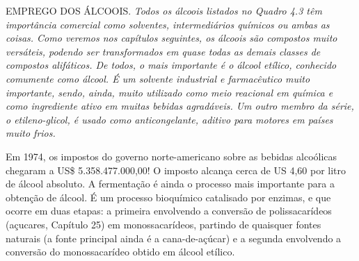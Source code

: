 \noindent EMPREGO DOS ÁLCOOIS. \emph{Todos os álcoois listados no Quadro 4.3 têm importância comercial como solventes, intermediários químicos ou ambas as coisas. Como veremos nos capítulos seguintes, os álcoois são compostos muito versáteis, podendo ser transformados em quase todas as demais classes de compostos alifáticos. De todos, o mais importante é o álcool etílico, conhecido comumente como álcool. É um solvente industrial e farmacêutico muito importante, sendo, ainda, muito utilizado como meio reacional em química e como ingrediente ativo em muitas bebidas agradáveis. Um outro membro da série, o etileno-glicol, é usado como anticongelante, aditivo para motores em países muito frios.}

Em 1974, os impostos do governo norte-americano sobre as bebidas alcoólicas chegaram a US\$ 5.358.477.000,00! O imposto alcança cerca de US 4,60 por litro de álcool absoluto. A fermentação é ainda o processo mais importante para a obtenção de álcool. É um processo bioquímico catalisado por enzimas, e que ocorre em duas etapas: a primeira envolvendo a conversão de polissacarídeos (açucares, Capítulo 25) em monossacarídeos, partindo de quaisquer fontes naturais (a fonte principal ainda é a cana-de-açúcar) e a segunda envolvendo a conversão do monossacarídeo obtido em álcool etílico. 